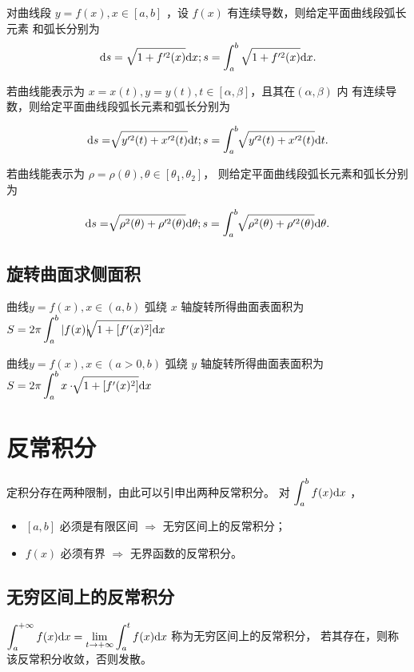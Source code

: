 对曲线段 $ y = f(x),x\in[a,b] $ ，设 $ f(x) $ 有连续导数，则给定平面曲线段弧长元素
和弧长分别为
$$ \displaystyle \mathrm{d}s = \displaystyle\sqrt{1+f'^2(x)}\mathrm{d}x;
s = \int_a^b \displaystyle\sqrt{1+f'^2(x)}\mathrm{d}x. $$

若曲线能表示为 $ x = x(t),y=y(t),t\in[\alpha,\beta] $，且其在$ (\alpha,\beta) $ 内
有连续导数，则给定平面曲线段弧长元素和弧长分别为

$$ \displaystyle \mathrm{d}s = \displaystyle\sqrt[]{y'^2(t)+x'^2(t)}\mathrm{d}t;
s = \int_a^b \displaystyle\sqrt[]{y'^2(t)+x'^2(t)}\mathrm{d}t. $$

若曲线能表示为 $ \rho = \rho(\theta),\theta\in[\theta_1,\theta_2] $，
则给定平面曲线段弧长元素和弧长分别为

$$ \displaystyle \mathrm{d}s = \displaystyle\sqrt[]{\rho^2(\theta)+\rho'^2(\theta)}\mathrm{d}\theta ;
s = \int_a^b \displaystyle\sqrt[]{\rho^2(\theta)+\rho'^2(\theta)}\mathrm{d}\theta. $$

\subsection{旋转曲面求侧面积}

曲线$ y = f(x),x\in(a,b) $ 弧绕 $ x $ 轴旋转所得曲面表面积为
$ \displaystyle S = 2\pi\int_a^b|f(x)|\displaystyle\sqrt[]{1+[f'(x)^2]}\mathrm{d}x $ 

曲线$ y = f(x),x\in(a > 0,b) $ 弧绕 $ y $ 轴旋转所得曲面表面积为
$ \displaystyle S = 2\pi\int_a^bx\cdot\displaystyle\sqrt[]{1+[f'(x)^2]}\mathrm{d}x $ 

\section{反常积分}

定积分存在两种限制，由此可以引申出两种反常积分。
对 $ \displaystyle \int_a^b f(x)\mathrm{d}x $ ，
\begin{itemize}
    \item $ [a,b] $ 必须是有限区间 $ \Rightarrow $ 无穷区间上的反常积分；
    \item $ f(x) $ 必须有界 $ \Rightarrow $ 无界函数的反常积分。
\end{itemize}

\subsection{无穷区间上的反常积分}

$ \displaystyle \int_a^{+\infty}f(x)\mathrm{d}x = {\displaystyle\lim_{t\rightarrow +\infty}}
\int_a^t f(x)\mathrm{d}x $ 称为无穷区间上的反常积分，
若其存在，则称该反常积分收敛，否则发散。\vspace{3pt}

